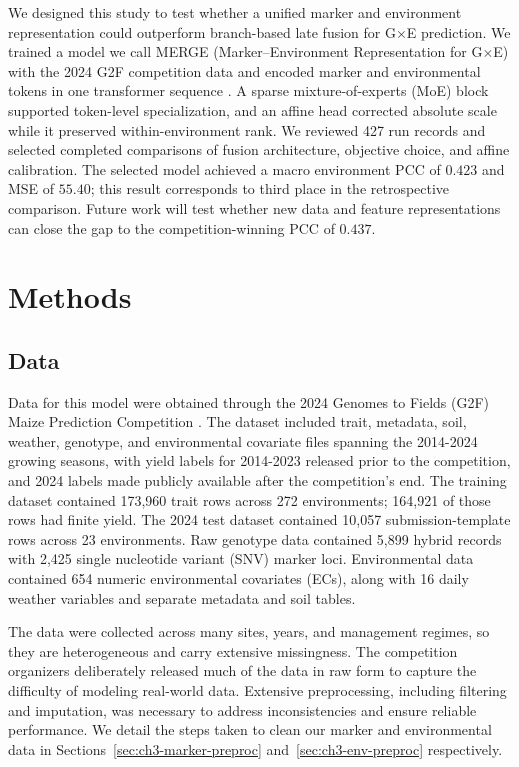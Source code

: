 We designed this study to test whether a unified marker and environment representation could outperform branch-based late fusion for G$\times$E prediction. We trained a model we call MERGE (Marker--Environment Representation for G$\times$E) with the 2024 G2F competition data and encoded marker and environmental tokens in one transformer sequence \cite{g2f-2024-competition,attention}. A sparse mixture-of-experts (MoE) block supported token-level specialization, and an affine head corrected absolute scale while it preserved within-environment rank. We reviewed 427 run records and selected completed comparisons of fusion architecture, objective choice, and affine calibration. The selected model achieved a macro environment PCC of $0.423$ and MSE of $55.40$; this result corresponds to third place in the retrospective comparison. Future work will test whether new data and feature representations can close the gap to the competition-winning PCC of $0.437$.

\section{Methods}
\subsection{Data}
Data for this model were obtained through the 2024 Genomes to Fields (G2F) Maize Prediction Competition \cite{g2f-2024-competition}. The dataset included trait, metadata, soil, weather, genotype, and environmental covariate files spanning the 2014-2024 growing seasons, with yield labels for 2014-2023 released prior to the competition, and 2024 labels made publicly available after the competition's end. The training dataset contained 173,960 trait rows across 272 environments; 164,921 of those rows had finite yield. The 2024 test dataset contained 10,057 submission-template rows across 23 environments. Raw genotype data contained 5,899 hybrid records with 2,425 single nucleotide variant (SNV) marker loci. Environmental data contained 654 numeric environmental covariates (ECs), along with 16 daily weather variables and separate metadata and soil tables.

The data were collected across many sites, years, and management regimes, so they are heterogeneous and carry extensive missingness. The competition organizers deliberately released much of the data in raw form to capture the difficulty of modeling real-world data. Extensive preprocessing, including filtering and imputation, was necessary to address inconsistencies and ensure reliable performance. We detail the steps taken to clean our marker and environmental data in Sections~\ref{sec:ch3-marker-preproc} and~\ref{sec:ch3-env-preproc} respectively.

